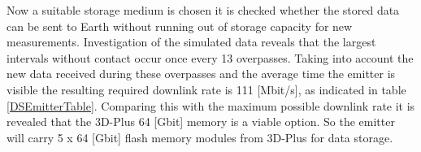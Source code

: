 Now a suitable storage medium is chosen it is checked whether the stored data can be sent to Earth without running out of storage capacity for new measurements. Investigation of the simulated data reveals that the largest intervals without contact occur once every 13 overpasses. Taking into account the new data received during these overpasses and the average time the emitter is visible the resulting required downlink rate is 111 [Mbit/s], as indicated in table \ref{DSEmitterTable}. Comparing this with the maximum possible downlink rate it is revealed that the 3D-Plus 64 [Gbit] memory is a viable option. So the emitter will carry 5 x 64 [Gbit] flash memory modules from 3D-Plus for data storage.
